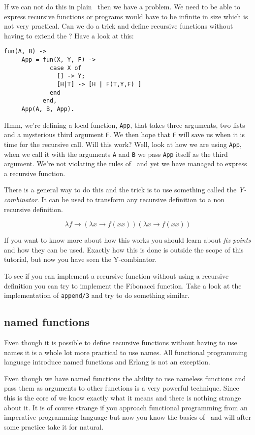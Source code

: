 \documentclass[a4paper,11pt]{article}
\begin{document}
If we can not do this in plain \lamc\ then we have a problem. We need
to be able to express recursive functions or programs would have to be
infinite in size which is not very practical. Can we do a trick and
define recursive functions without having to extend the \lamc? Have a look at this:

\begin{verbatim}
fun(A, B) ->
     App = fun(X, Y, F) -> 
             case X of 
               [] -> Y;
               [H|T] -> [H | F(T,Y,F) ]
             end
           end,
     App(A, B, App).
\end{verbatim}

Hmm, we're defining a local function, {\tt App}, that takes three
arguments, two lists and a mysterious third argument {\tt F}. We then
hope that {\tt F} will save us when it is time for the recursive
call. Will this work? Well, look at how we are using {\tt App}, when
we call it with the arguments {\tt A} and {\tt B} we pass {\tt App}
itself as the third argument. We're not violating the rules of \lamc\
and yet we have managed to express a recursive function.

There is a general way to do this and the trick is to use something
called the {\em Y-combinator}. It can be used to transform any
recursive definition to a non recursive definition.

$$\lambda f \rightarrow (\lambda x \rightarrow f(x x)) (\lambda x \rightarrow f (x x))$$

If you want to know more about how this works you should learn about
{\em fix points} and how they can be used. Exactly how this is done is outside
the scope of this tutorial, but now you have seen the Y-combinator.

To see if you can implement a recursive function without using a
recursive definition you can try to implement the Fibonacci
function. Take a look at the implementation of {\tt append/3} and try
to do something similar.

\subsection{named functions}

Even though it is possible to define recursive functions without
having to use names it is a whole lot more practical to use names.
All functional programming language introduce named functions and
Erlang is not an exception.

Even though we have named functions the ability to use nameless
functions and pass them as arguments to other functions is a very
powerful technique. Since this is the core of \lamc we know exactly
what it means and there is nothing strange about it. It is of course
strange if you approach functional programming from an imperative
programming language but now you know the basics of \lamc\ and will
after some practice take it for natural.
\end{document}
